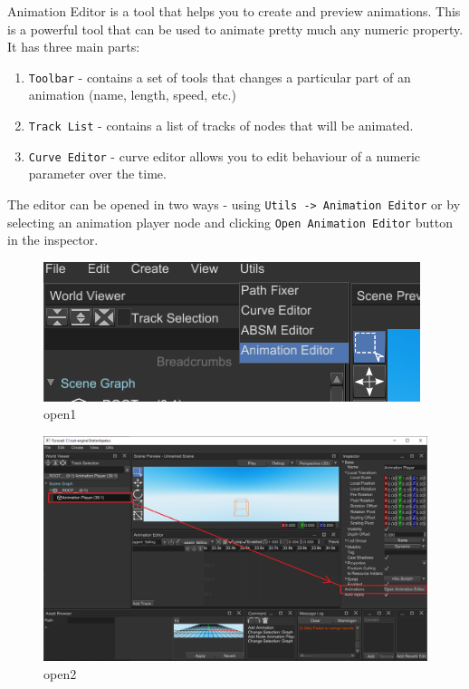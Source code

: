 \documentclass[
]{book}
\providecommand{\tightlist}{%
  \setlength{\itemsep}{0pt}\setlength{\parskip}{0pt}}
\theoremstyle{definition}
\theoremstyle{definition}
\theoremstyle{definition}
\theoremstyle{definition}
\theoremstyle{remark}
\begin{document}
Animation Editor is a tool that helps you to create and preview animations. This is a powerful tool that can be used to animate pretty much any numeric property. It has three main parts:

\begin{enumerate}
\def\labelenumi{\arabic{enumi}.}
\tightlist
\item
  \texttt{Toolbar} - contains a set of tools that changes a particular part of an animation (name, length, speed, etc.)
\item
  \texttt{Track\ List} - contains a list of tracks of nodes that will be animated.
\item
  \texttt{Curve\ Editor} - curve editor allows you to edit behaviour of a numeric parameter over the time.
\end{enumerate}

The editor can be opened in two ways - using \texttt{Utils\ -\textgreater{}\ Animation\ Editor} or by selecting an animation player node and clicking \texttt{Open\ Animation\ Editor} button in the inspector.

\begin{figure}
\centering
\includegraphics{images/animation/ae_open1.png}
\caption{open1}
\end{figure}

\begin{figure}
\centering
\includegraphics{images/animation/ae_open2.png}
\caption{open2}
\end{figure}
\end{document}
